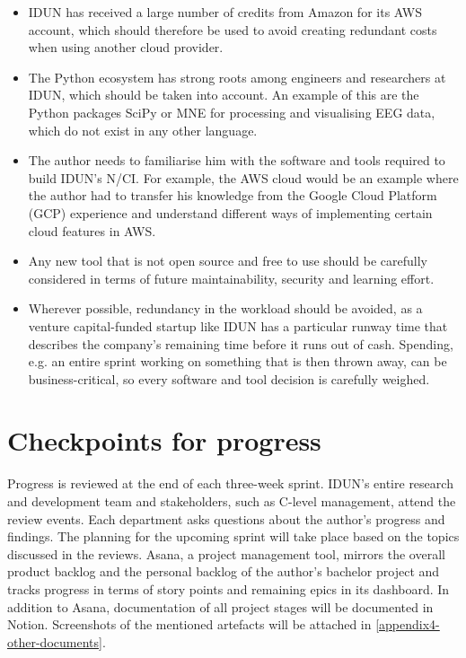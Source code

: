 \begin{itemize}
  \item IDUN has received a large number of credits from Amazon for its AWS account, which should therefore be used to avoid creating redundant costs when using another cloud provider.
  \item The Python ecosystem has strong roots among engineers and researchers at IDUN, which should be taken into account. An example of this are the Python packages SciPy or MNE for processing and visualising EEG data, which do not exist in any other language.
  \item The author needs to familiarise him with the software and tools required to build IDUN's N/CI. For example, the AWS cloud would be an example where the author had to transfer his knowledge from the Google Cloud Platform (GCP) experience and understand different ways of implementing certain cloud features in AWS.
  \item Any new tool that is not open source and free to use should be carefully considered in terms of future maintainability, security and learning effort.
  \item Wherever possible, redundancy in the workload should be avoided, as a venture capital-funded startup like IDUN has a particular runway time that describes the company's remaining time before it runs out of cash. Spending, e.g. an entire sprint working on something that is then thrown away, can be business-critical, so every software and tool decision is carefully weighed.
\end{itemize}

\section{Checkpoints for progress}
\label{chapter3-checkpoints-for-progress}

Progress is reviewed at the end of each three-week sprint. IDUN's entire research and development team and stakeholders, such as C-level management, attend the review events. Each department asks questions about the author's progress and findings. The planning for the upcoming sprint will take place based on the topics discussed in the reviews. Asana, a project management tool, mirrors the overall product backlog and the personal backlog of the author's bachelor project and tracks progress in terms of story points and remaining epics in its dashboard. In addition to Asana, documentation of all project stages will be documented in Notion. Screenshots of the mentioned artefacts will be attached in \autoref{appendix4-other-documents}.

